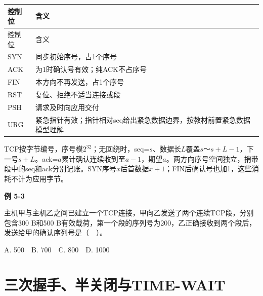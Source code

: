 \par\smallskip
{\fontsize{9.3}{12}\selectfont\setlength{\tabcolsep}{2.5pt}\setlength{\LTleft}{0pt}\setlength{\LTright}{0pt}
\begin{longtable}{@{}>{\raggedright\arraybackslash}p{}>{\raggedright\arraybackslash}p{}@{}}
\toprule
控制位 & 含义 \\

\midrule\endfirsthead\toprule
控制位 & 含义 \\

\midrule\endhead\bottomrule\endfoot
SYN & 同步初始序号，占1个序号 \\

ACK & 为1时确认号有效；纯ACK不占序号 \\

FIN & 本方向不再发送，占1个序号 \\

RST & 复位、拒绝不适当连接或段 \\

PSH & 请求及时向应用交付 \\

URG & 紧急指针有效；指针相对seq给出紧急数据边界，按教材前置紧急数据模型理解 \\

\end{longtable}}
\par\smallskip

TCP按字节编号，序号模\(2^{32}\)；无回绕时，seq=\(s\)、数据长\(L\)覆盖\(s\)～\(s+L-1\)，下一号\(s+L\)。ack=\(a\)累计确认连续收到至\(a-1\)，期望\(a\)。两方向序号空间独立，捎带段中的seq和ack分别记账。SYN序号\(x\)后首数据\(x+1\)；FIN后确认号也加1，这些消耗不计为应用字节。

\par\medskip{}\noindent\hypertarget{CN05-E03}{}\label{CN05-E03}\textbf{例 5-3}\par\nobreak\smallskip

主机甲与主机乙之间已建立一个TCP连接，甲向乙发送了两个连续TCP段，分别包含300 B和500 B有效载荷，第一个段的序列号为200，乙正确接收到两个段后，发送给甲的确认序列号是（　）。

A. 500　B. 700　C. 800　D. 1000

\section{三次握手、半关闭与TIME-WAIT}\label{CN05-connection}

